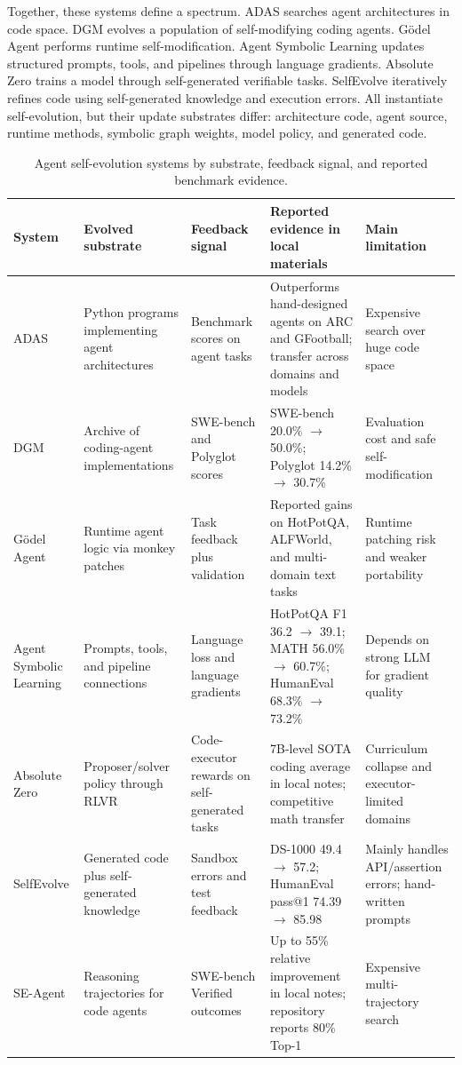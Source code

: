 Together, these systems define a spectrum.  ADAS searches agent architectures in code space.  DGM evolves a population of self-modifying coding agents.  G{\"o}del Agent performs runtime self-modification.  Agent Symbolic Learning updates structured prompts, tools, and pipelines through language gradients.  Absolute Zero trains a model through self-generated verifiable tasks.  SelfEvolve iteratively refines code using self-generated knowledge and execution errors.  All instantiate self-evolution, but their update substrates differ: architecture code, agent source, runtime methods, symbolic graph weights, model policy, and generated code.

\begin{table}[t]
\centering
\caption{Agent self-evolution systems by substrate, feedback signal, and reported benchmark evidence.}
\label{tab:agent-self-evolution-systems}
{\TableTight
\begin{tabularx}{\textwidth}{@{}L{0.13\textwidth}L{0.18\textwidth}L{0.19\textwidth}L{0.27\textwidth}Y@{}}
\toprule
\textbf{System} & \textbf{Evolved substrate} & \textbf{Feedback signal} & \textbf{Reported evidence in local materials} & \textbf{Main limitation} \\
\midrule
ADAS & Python programs implementing agent architectures & Benchmark scores on agent tasks & Outperforms hand-designed agents on ARC and GFootball; transfer across domains and models & Expensive search over huge code space \\
DGM & Archive of coding-agent implementations & SWE-bench and Polyglot scores & SWE-bench 20.0\% $\rightarrow$ 50.0\%; Polyglot 14.2\% $\rightarrow$ 30.7\% & Evaluation cost and safe self-modification \\
G{\"o}del Agent & Runtime agent logic via monkey patches & Task feedback plus validation & Reported gains on HotPotQA, ALFWorld, and multi-domain text tasks & Runtime patching risk and weaker portability \\
Agent Symbolic Learning & Prompts, tools, and pipeline connections & Language loss and language gradients & HotPotQA F1 36.2 $\rightarrow$ 39.1; MATH 56.0\% $\rightarrow$ 60.7\%; HumanEval 68.3\% $\rightarrow$ 73.2\% & Depends on strong LLM for gradient quality \\
Absolute Zero & Proposer/solver policy through RLVR & Code-executor rewards on self-generated tasks & 7B-level SOTA coding average in local notes; competitive math transfer & Curriculum collapse and executor-limited domains \\
SelfEvolve & Generated code plus self-generated knowledge & Sandbox errors and test feedback & DS-1000 49.4 $\rightarrow$ 57.2; HumanEval pass@1 74.39 $\rightarrow$ 85.98 & Mainly handles API/assertion errors; hand-written prompts \\
SE-Agent & Reasoning trajectories for code agents & SWE-bench Verified outcomes & Up to 55\% relative improvement in local notes; repository reports 80\% Top-1 & Expensive multi-trajectory search \\
\bottomrule
\end{tabularx}}
\end{table}

